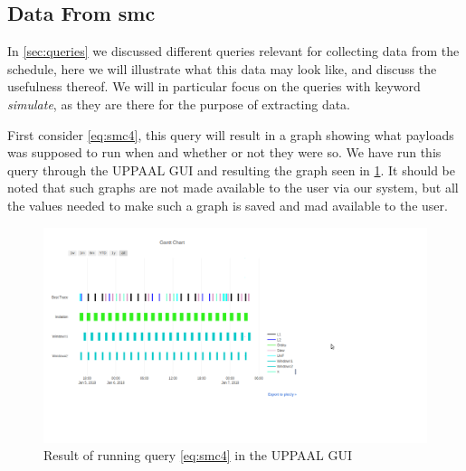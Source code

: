 \subsection{Data From \gls{smc}}
In \cref{sec:queries} we discussed different queries relevant for collecting data from the schedule, here we will illustrate what this data may look like, and discuss the usefulness thereof. We will in particular focus on the queries with keyword \textit{simulate}, as they are there for the purpose of extracting data.

First consider \cref{eq:smc4}, this query will result in a graph showing what payloads was supposed to run when and whether or not they were so. We have run this query through the UPPAAL GUI and resulting the graph seen in \cref{fig:active_running}. It should be noted that such graphs are not made available to the user via our system, but all the values needed to make such a graph is saved and mad available to the user.

\begin{figure}[!h]
	\includegraphics[width=\textwidth]{graphics/gantt.png}
	\caption{Result of running query \cref{eq:smc4} in the UPPAAL GUI}
	\label{fig:active_running}
	\end{figure}